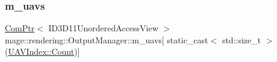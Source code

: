 \mbox{\label{classmage_1_1rendering_1_1_output_manager_a5c0ae88c300a1fe09f19d4cca3bef197}} 
\subsubsection{\texorpdfstring{m\+\_\+uavs}{m\_uavs}}
{\footnotesize\ttfamily \mbox{\hyperlink{namespacemage_ae74f374780900893caa5555d1031fd79}{Com\+Ptr}}$<$ I\+D3\+D11\+Unordered\+Access\+View $>$ mage\+::rendering\+::\+Output\+Manager\+::m\+\_\+uavs\mbox{[} static\+\_\+cast$<$ std\+::size\+\_\+t $>$(\mbox{\hyperlink{classmage_1_1rendering_1_1_output_manager_a71b3797fef957312f92736f15b7ada3eae93f994f01c537c4e2f7d8528c3eb5e9}{U\+A\+V\+Index\+::\+Count}})\mbox{]}\hspace{0.3cm}{\ttfamily [private]}}

